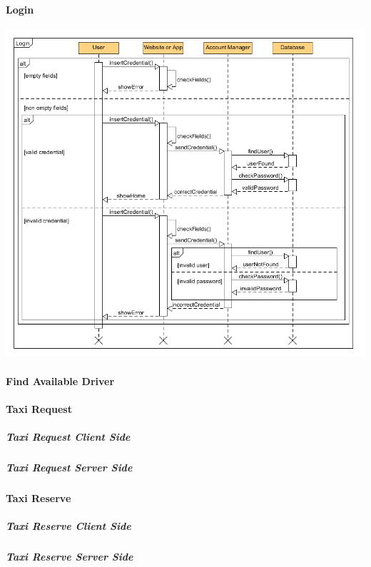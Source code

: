 \paragraph{Login}
\begin{center}
	\includegraphics[width=\textwidth]{diagrams/Login.png}
\end{center}
\paragraph{Find Available Driver}

\paragraph{Taxi Request}
	\subparagraph{Taxi Request Client Side}
	\subparagraph{Taxi Request Server Side}

\paragraph{Taxi Reserve}
	\subparagraph{Taxi Reserve Client Side}
	\subparagraph{Taxi Reserve Server Side}
